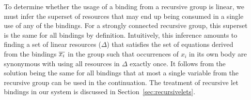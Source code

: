 \documentclass[acmsmall,review,anonymous,screen]{acmart}
\newcommand{\incode}[1]{\lstinline{#1}}
\newcommand{\lolli}{\multimap}
\begin{document}
%

To determine whether the usage of a binding from a recursive group is
linear,
we must infer the superset of resources that may end up being consumed
in a single use of any of the bindings. For a strongly connected recursive
group, this superset is the same for all bindings by definition.
%
Intuitively, this inference amounts to finding a set of linear resources
($\Delta$) that satisfies the set of equations derived from the bindings
$\overline{x_i}$ in the group such that
occurrences of $x_i$ in its own body are synonymous with using all resources in $\Delta$ exactly once.
%
It follows from the solution being the same for all bindings that
at most a single variable from the recursive group can be used in the continuation.
%
The treatment of recursive let bindings in our system is discussed in Section~\ref{sec:recursivelets}.

\end{document}
